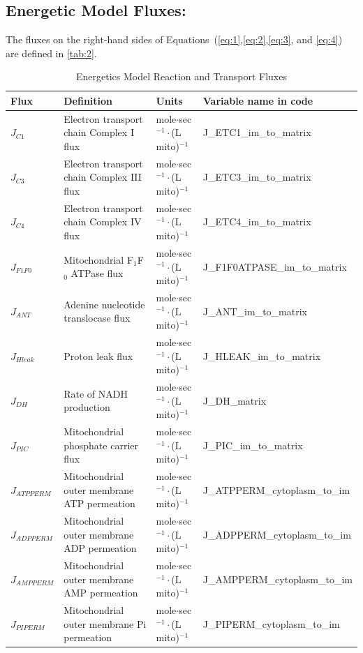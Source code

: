\documentclass[fleqn,10pt]{physiome}
\begin{document}
\subsection{Energetic Model Fluxes:}

The fluxes on the right-hand sides of Equations~(\ref{eq:1},\ref{eq:2},\ref{eq:3}, and \ref{eq:4}) are defined in \autoref{tab:2}.

\begin{table}[ht]\centering
\small
\caption{Energetics Model Reaction and Transport Fluxes}\label{tab:2}
\begin{supertabular}{l p{3.0cm} l l}
\toprule
Flux & Definition & Units & Variable name in code \\
\midrule
$J_{C1}$  & Electron transport chain Complex I flux   & 
    mole$\cdot$sec$^{-1}\cdot$(L mito)$^{-1}$ & J\_ETC1\_im\_to\_matrix \\
$J_{C3}$  & Electron transport chain Complex III flux & 
    mole$\cdot$sec$^{-1}\cdot$(L mito)$^{-1}$ & J\_ETC3\_im\_to\_matrix \\
$J_{C4}$  & Electron transport chain Complex IV flux  & 
    mole$\cdot$sec$^{-1}\cdot$(L mito)$^{-1}$ & J\_ETC4\_im\_to\_matrix \\

$J_{F1F0}$  & Mitochondrial F$_1$F$_0$ ATPase flux  & 
    mole$\cdot$sec$^{-1}\cdot$(L mito)$^{-1}$ & J\_F1F0ATPASE\_im\_to\_matrix \\
$J_{ANT}$  & Adenine nucleotide translocase flux   & 
    mole$\cdot$sec$^{-1}\cdot$(L mito)$^{-1}$ & J\_ANT\_im\_to\_matrix \\
$J_{Hleak}$  & Proton leak flux   & 
    mole$\cdot$sec$^{-1}\cdot$(L mito)$^{-1}$ & J\_HLEAK\_im\_to\_matrix \\
$J_{DH}$  & Rate of NADH production  & 
    mole$\cdot$sec$^{-1}\cdot$(L mito)$^{-1}$ & J\_DH\_matrix \\
$J_{PIC}$  & Mitochondrial phosphate carrier flux   & 
    mole$\cdot$sec$^{-1}\cdot$(L mito)$^{-1}$ & J\_PIC\_im\_to\_matrix \\

$J_{ATPPERM}$  & Mitochondrial outer membrane ATP permeation  & 
    mole$\cdot$sec$^{-1}\cdot$(L mito)$^{-1}$ & J\_ATPPERM\_cytoplasm\_to\_im \\
$J_{ADPPERM}$  & Mitochondrial outer membrane ADP permeation  & 
    mole$\cdot$sec$^{-1}\cdot$(L mito)$^{-1}$ & J\_ADPPERM\_cytoplasm\_to\_im \\
$J_{AMPPERM}$  & Mitochondrial outer membrane AMP permeation  & 
    mole$\cdot$sec$^{-1}\cdot$(L mito)$^{-1}$ & J\_AMPPERM\_cytoplasm\_to\_im \\
$J_{PIPERM}$  & Mitochondrial outer membrane Pi permeation  & 
    mole$\cdot$sec$^{-1}\cdot$(L mito)$^{-1}$ & J\_PIPERM\_cytoplasm\_to\_im \\


\end{supertabular}
\end{table}
\end{document}
